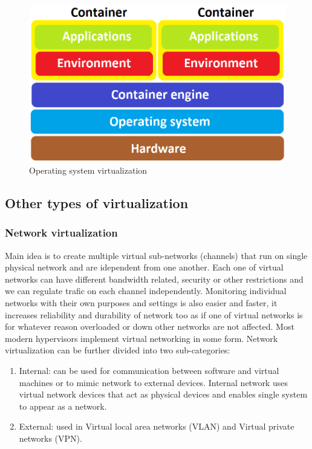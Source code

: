 \begin{enumerate}
\begin{figure}[H]
\centering
\includegraphics[scale=0.45]{container.png}
\caption{Operating system virtualization}
\end{figure}


\subsection{Other types of virtualization}
\subsubsection{Network virtualization}
Main idea is to create multiple virtual sub-networks (channels) that run on single physical network and are idependent from one another. Each one of virtual networks can have different bandwidth related, security or other restrictions and we can regulate trafic on each channel independently.  Monitoring individual networks with their own purposes and settings is also easier and faster, it increases reliability and durability of network too as if one of virtual networks is for whatever reason overloaded or down other networks are not affected. Most modern hypervisors implement virtual networking in some form. Network virtualization can be further divided into two sub-categories:
\begin{enumerate}
\item Internal: can be used for communication between software and virtual machines or to mimic network to external devices. Internal network uses virtual network devices that act as physical devices and enables single system to appear as a network.
\item External: used in Virtual local area networks (VLAN) and Virtual private networks (VPN).
\end{enumerate}


\end{enumerate}
